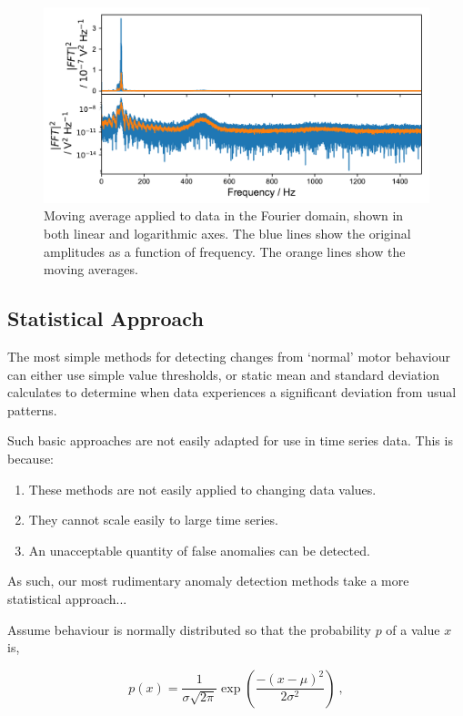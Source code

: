 \begin{figure}[t]
    \includegraphics[width=1.0\textwidth]{fig/freq_moving_average.pdf}
    \caption[Fourier Domain]{Moving average applied to data in the Fourier domain, shown in both linear and logarithmic axes. The blue lines show the original amplitudes as a function of frequency. The orange lines show the moving averages.}
    \label{fig:freq_moving_av}
\end{figure}


\subsection{Statistical Approach}

The most simple methods for detecting changes from `normal' motor behaviour can either use simple value thresholds, or static mean and standard deviation calculates to determine when data experiences a significant deviation from usual patterns. 

Such basic approaches are not easily adapted for use in time series data. This is because:

\begin{enumerate}
    \item These methods are not easily applied to changing data values.
    \item They cannot scale easily to large time series.
    \item An unacceptable quantity of false anomalies can be detected.
\end{enumerate}

As such, our most rudimentary anomaly detection methods take a more statistical approach...

Assume behaviour is normally distributed so that the probability $p$ of a value $x$ is,

\begin{equation}
    p(x) = \dfrac{1}{\sigma \sqrt{2\pi}}\exp(\dfrac{-{(x-\mu)}^2}{2\sigma^2})~,
\end{equation}

